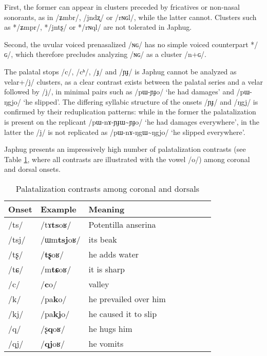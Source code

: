 \documentclass[oneside,a4paper,11pt]{article}
\newcommand{\ipa}[1]{\mbox{\phon/#1/}}
\newcommand{\tld}{\textasciitilde{}}
\begin{document}
First, the former can appear in clusters preceded by fricatives or non-nasal sonorants, as in \ipa{ʑmbr}, \ipa{jndʐ} or \ipa{rɴɢl}, while the latter cannot. Clusters such as *\ipa{ʑmpr}, *\ipa{jntʂ} or *\ipa{rɴql} are not tolerated in Japhug.

Second, the uvular voiced prenasalized \ipa{ɴɢ} has no simple voiced counterpart *\ipa{ɢ}, which therefore precludes analyzing \ipa{ɴɢ} as a cluster \ipa{n+ɢ}.

The palatal stops \ipa{c}, \ipa{cʰ}, \ipa{ɟ} and \ipa{ɲɟ} is Japhug cannot be analyzed as velar+\ipa{j} clusters, as a clear contrast exists between the palatal series and a velar followed by \ipa{j}, in minimal pairs such as   \ipa{pɯ-ɲɟo} `he had damages' and \ipa{pɯ-ŋgjo} `he slipped'. The differing syllabic structure of the onsets \ipa{ɲɟ} and \ipa{ŋgj} is confirmed by their reduplication patterns: while in the former the palatalization is present on the replicant \ipa{pɯ-nɤ-ɲɟɯ\tld{}ɲɟo} `he had damages everywhere', in the latter the \ipa{j} is not replicated as  \ipa{pɯ-nɤ-ŋgɯ\tld{}ŋgjo} `he slipped everywhere'.

Japhug   presents an impressively high number of palatalization contrasts (see Table \ref{tab:coronal.dorsal}, where all contrasts are illustrated with the vowel \ipa{o}) among coronal and dorsal onsets. 

		   \begin{table}
 \caption{Palatalization contrasts among coronal and dorsals } \label{tab:coronal.dorsal}  \centering
\begin{tabular}{llllllll}
\toprule		
Onset & Example & Meaning \\
\midrule
\ipa{ts} &\ipa{tɤ\textbf{ts}oʁ}  & Potentilla anserina \\
\ipa{tsj} &     \ipa{ɯm\textbf{tsj}oʁ}  & its beak \\
\ipa{tʂ} &\ipa{\textbf{tʂ}oʁ}  & he adds water \\
\ipa{tɕ} &\ipa{m\textbf{tɕ}oʁ}  &it is sharp\\
\ipa{c} & \ipa{\textbf{c}o}  & valley \\
 \ipa{k} & \ipa{pa\textbf{k}o}  & he prevailed over him \\
 \ipa{kj} & \ipa{pa\textbf{kj}o}  & he caused it to slip \\
 \ipa{q} & \ipa{ʂ\textbf{q}oʁ}  &he hugs him \\
 \ipa{qj} & \ipa{\textbf{qj}oʁ}  & he vomits \\
 \bottomrule
\end{tabular}
\end{table}
 
\end{document}
